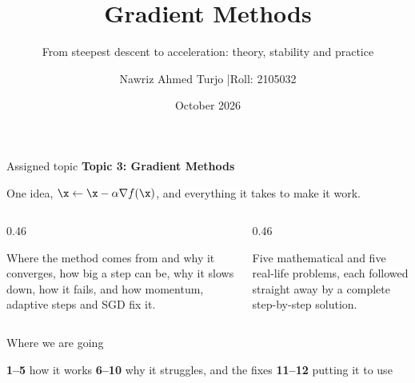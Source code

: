 \documentclass[aspectratio=169, 11pt]{beamer}
\title{Gradient Methods}
\subtitle{From steepest descent to acceleration: theory, stability and practice}
\author{Nawriz Ahmed Turjo \quad|\quad Roll: 2105032}
\institute{CSE 402: Numerical Analysis \quad|\quad Assignment Topic 3}
\date{October 2026}
\begin{document}
\maketitle

\begin{frame}{Assigned topic}
  \centering
  \vspace{6pt}
  {\Large\textbf{Topic 3: Gradient Methods}}

  \vspace{4pt}
  {\small One idea, $\x\gets\x-\alpha\nabla f(\x)$, and everything it takes to make it work.}

  \vspace{12pt}
  \begin{columns}[T]
    \begin{column}{0.46\textwidth}
      \begin{keybox}
        \small Where the method comes from and why it converges, how big a step can be, why it slows down,
        how it fails, and how momentum, adaptive steps and SGD fix it.
      \end{keybox}
    \end{column}
    \begin{column}{0.46\textwidth}
      \begin{probbox}
        \small Five mathematical and five real-life problems, each followed straight away by a complete
        step-by-step solution.
      \end{probbox}
    \end{column}
  \end{columns}
\end{frame}

\begin{frame}{Where we are going}
  \centering
  \vspace{6pt}
  

  \vspace{8pt}
  \footnotesize
  \textcolor{mDarkTeal}{\textbf{1--5}} how it works \qquad
  \textcolor{mOrange}{\textbf{6--10}} why it struggles, and the fixes \qquad
  \textcolor{mGreen}{\textbf{11--12}} putting it to use
\end{frame}

\end{document}
